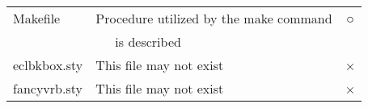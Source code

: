 \begin{table}[t]
\begin{center}
\begin{tabular}{l|l|c}
Makefile & Procedure utilized by the make command & ○ \\
 & ~~~is described &  \\\hline\hline
 
eclbkbox.sty & This file may not exist & × \\\hline
fancyvrb.sty & This file may not exist & × \\\hline\hline
\end{tabular} 
\label{table:filelist}
\end{center}
\end{table}